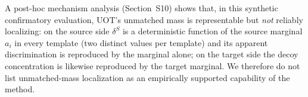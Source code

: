 
A post-hoc mechanism analysis (Section~S10) shows that, in this synthetic confirmatory
evaluation, UOT's unmatched mass is representable but \emph{not} reliably localizing:
on the source side $\delta^S$ is a deterministic function of the source marginal $a_i$ in
every template (two distinct values per template) and its apparent discrimination is
reproduced by the marginal alone; on the target side the decoy concentration is likewise
reproduced by the target marginal. We therefore do not list unmatched-mass localization as
an empirically supported capability of the method.
